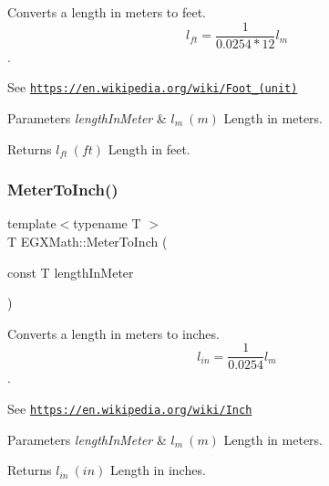 Converts a length in meters to feet. \[ l_{ft}= \frac{1}{0.0254 * 12} l_{m} \]. 

See \href{https://en.wikipedia.org/wiki/Foot_(unit)}{\tt https\+://en.\+wikipedia.\+org/wiki/\+Foot\+\_\+(unit)} 
\begin{DoxyParams}{Parameters}
{\em length\+In\+Meter} & $ l_{m}\ (m)$ Length in meters. \\
\hline
\end{DoxyParams}
\begin{DoxyReturn}{Returns}
$ l_{ft}\ (ft)$ Length in feet. 
\end{DoxyReturn}
\mbox{\label{group___e_g_x_math-_conversions-_length_conversions-_s_i-_meter-_imperial_gaaf056673bfe97e10a61a527f4b3598ba}} 
\subsubsection{\texorpdfstring{Meter\+To\+Inch()}{MeterToInch()}}
{\footnotesize\ttfamily template$<$typename T $>$ \\
T E\+G\+X\+Math\+::\+Meter\+To\+Inch (\begin{DoxyParamCaption}\item[{const T}]{length\+In\+Meter }\end{DoxyParamCaption})}



Converts a length in meters to inches. \[ l_{in}=\frac{1}{0.0254} l_{m} \]. 

See \href{https://en.wikipedia.org/wiki/Inch}{\tt https\+://en.\+wikipedia.\+org/wiki/\+Inch} 
\begin{DoxyParams}{Parameters}
{\em length\+In\+Meter} & $ l_{m}\ (m)$ Length in meters. \\
\hline
\end{DoxyParams}
\begin{DoxyReturn}{Returns}
$ l_{in}\ (in)$ Length in inches. 
\end{DoxyReturn}
\mbox{\label{group___e_g_x_math-_conversions-_length_conversions-_s_i-_meter-_imperial_ga6a58893d0f7e17e425c7bd0b3235320d}} 
